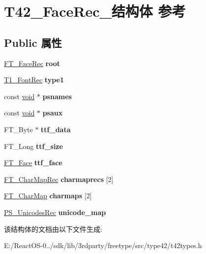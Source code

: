 \hypertarget{struct_t42___face_rec__}{}\section{T42\+\_\+\+Face\+Rec\+\_\+结构体 参考}
\label{struct_t42___face_rec__}
\subsection*{Public 属性}
\begin{DoxyCompactItemize}
\item 
\mbox{\label{struct_t42___face_rec___abe06101c9b69119dc575312e204964dc}} 
\hyperlink{struct_f_t___face_rec__}{F\+T\+\_\+\+Face\+Rec} {\bfseries root}
\item 
\mbox{\label{struct_t42___face_rec___ac526c9f37d9bc12e254cbab6c52baf50}} 
\hyperlink{struct_t1___font_rec__}{T1\+\_\+\+Font\+Rec} {\bfseries type1}
\item 
\mbox{\label{struct_t42___face_rec___a3615cff933bce5beed22b6eaae45832c}} 
const \hyperlink{interfacevoid}{void} $\ast$ {\bfseries psnames}
\item 
\mbox{\label{struct_t42___face_rec___af50a7ef274e510d37d937481008c91bb}} 
const \hyperlink{interfacevoid}{void} $\ast$ {\bfseries psaux}
\item 
\mbox{\label{struct_t42___face_rec___aed1e79e76d1a7880647a9fb692c770fe}} 
F\+T\+\_\+\+Byte $\ast$ {\bfseries ttf\+\_\+data}
\item 
\mbox{\label{struct_t42___face_rec___a39ef5306c6b6b027a3f36f77746dc62f}} 
F\+T\+\_\+\+Long {\bfseries ttf\+\_\+size}
\item 
\mbox{\label{struct_t42___face_rec___a61182a51e9a4c2fd3902a33fa56963d3}} 
\hyperlink{struct_f_t___face_rec__}{F\+T\+\_\+\+Face} {\bfseries ttf\+\_\+face}
\item 
\mbox{\label{struct_t42___face_rec___aa842baec39075f9a4fc0cfb0024dbf46}} 
\hyperlink{struct_f_t___char_map_rec__}{F\+T\+\_\+\+Char\+Map\+Rec} {\bfseries charmaprecs} \mbox{[}2\mbox{]}
\item 
\mbox{\label{struct_t42___face_rec___a607785291a0275374a35bf8b25f7b79f}} 
\hyperlink{struct_f_t___char_map_rec__}{F\+T\+\_\+\+Char\+Map} {\bfseries charmaps} \mbox{[}2\mbox{]}
\item 
\mbox{\label{struct_t42___face_rec___ade91b4fcad8368091aa3cc948204da5c}} 
\hyperlink{struct_p_s___unicodes_rec__}{P\+S\+\_\+\+Unicodes\+Rec} {\bfseries unicode\+\_\+map}
\end{DoxyCompactItemize}


该结构体的文档由以下文件生成\+:\begin{DoxyCompactItemize}
\item 
E\+:/\+React\+O\+S-\/0../sdk/lib/3rdparty/freetype/src/type42/t42types.\+h\end{DoxyCompactItemize}
